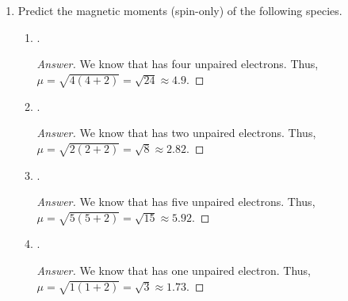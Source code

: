 \documentclass[../psets.tex]{subfiles}
\begin{document}
\begin{enumerate}[label={\Roman*)}]
\begin{enumerate}[label={\textbf{10.\arabic*}}]
\begin{enumerate}[label={\textbf{\alph*.}}]
\begin{proof}[Answer]
\begin{center}
\begin{tikzpicture}[
                        yshift=0.6,
                        every node/.prefix style={black}
                    ]
                    \end{tikzpicture}
                \end{center}
            \end{proof}
            \item A coordination compound with a magnetic moment of $5.1$ Bohr magnetons.
            \begin{proof}[Answer]
                Using the spin-only magnetic moment formula $\mu_S=\sqrt{n(n+2)}$, we can solve for $n$ with the quadratic formula, take the positive answer, and round.
                \begin{align*}
                    5.1 &= \sqrt{n(n+2)}\\
                    0 &= n^2+2n-5.1^2\\
                    n &\approx 4
                \end{align*}
            \end{proof}
        \end{enumerate}
        \newpage
        \setcounter{enumii}{5}
        \item Predict the magnetic moments (spin-only) of the following species.
        \begin{enumerate}[label={\textbf{\alph*.}}]
            \item {}.
            \begin{proof}[Answer]
                We know that  has four unpaired electrons. Thus, $\mu=\sqrt{4(4+2)}=\sqrt{24}\approx 4.9$.
            \end{proof}
            \item {}.
            \begin{proof}[Answer]
                We know that  has two unpaired electrons. Thus, $\mu=\sqrt{2(2+2)}=\sqrt{8}\approx 2.82$.
            \end{proof}
            \item \ce{[FeCl4]-}.
            \begin{proof}[Answer]
                We know that \ce{[FeCl4]-} has five unpaired electrons. Thus, $\mu=\sqrt{5(5+2)}=\sqrt{15}\approx 5.92$.
            \end{proof}
            \item {}.
            \begin{proof}[Answer]
                We know that  has one unpaired electron. Thus, $\mu=\sqrt{1(1+2)}=\sqrt{3}\approx 1.73$.
            \end{proof}

\end{enumerate}
\end{enumerate}
\end{enumerate}
\end{document}
